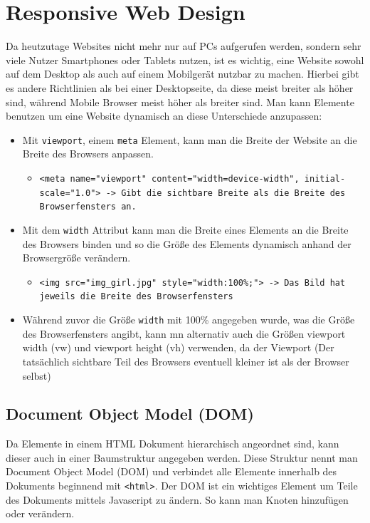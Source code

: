 \documentclass{article}
\begin{document}
	\section{Responsive Web Design}
	Da heutzutage Websites nicht mehr nur auf PCs aufgerufen werden, sondern sehr viele Nutzer Smartphones oder Tablets nutzen, ist es wichtig, eine Website sowohl auf dem Desktop als auch auf einem Mobilgerät nutzbar zu machen. Hierbei gibt es andere Richtlinien als bei einer Desktopseite, da diese meist breiter als höher sind, während Mobile Browser meist höher als breiter sind. Man kann Elemente benutzen um eine Website dynamisch an diese Unterschiede anzupassen:
	\begin{itemize}
		\item{Mit \texttt{viewport}, einem \texttt{meta} Element, kann man die Breite der Website an die Breite des Browsers anpassen.}
		\begin{itemize}
			\item{\texttt{<meta name="viewport" content="width=device-width", initial-scale="1.0"> -> Gibt die sichtbare Breite als die Breite des Browserfensters an.}}
		\end{itemize}
		\item{Mit dem \texttt{width} Attribut kann man die Breite eines Elements an die Breite des Browsers binden und so die Größe des Elements dynamisch anhand der Browsergröße verändern.}
		\begin{itemize}
			\item{\verb|<img src="img_girl.jpg" style="width:100%;"> -> Das Bild hat jeweils die Breite des Browserfensters|}
		\end{itemize}
		\item{Während zuvor die Größe \texttt{width} mit 100\% angegeben wurde, was die Größe des Browserfensters angibt, kann mn alternativ auch die Größen viewport width (vw) und viewport height (vh) verwenden, da der Viewport (Der tatsächlich sichtbare Teil des Browsers eventuell kleiner ist als der Browser selbst)}
	\end{itemize}
	\subsection{Document Object Model (DOM)}
	Da Elemente in einem HTML Dokument hierarchisch angeordnet sind, kann dieser auch in einer Baumstruktur angegeben werden. Diese Struktur nennt man Document Object Model (DOM) und verbindet alle Elemente innerhalb des Dokuments beginnend mit \texttt{<html>}. Der DOM ist ein wichtiges Element um Teile des Dokuments mittels Javascript zu ändern. So kann man Knoten hinzufügen oder verändern.
\end{document}
